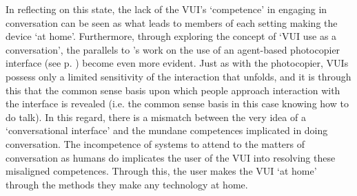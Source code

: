 \begin{corrections}
In reflecting on this state, the lack of the \ac{VUI}'s `competence' in engaging in conversation can be seen as what leads to members of each setting making the device `at home'.
Furthermore, through exploring the concept of `\ac{VUI} use as a conversation', the parallels to \citet{Suchman1985}'s work on the use of an agent-based photocopier interface (see p. \pageref{line:suchman}) become even more evident.
Just as with the photocopier, \acp{VUI} possess only a limited sensitivity of the interaction that unfolds, and it is through this that the common sense basis upon which people approach interaction with the interface is revealed (i.e. the common sense basis in this case knowing how to do talk).
In this regard, there is a mismatch between the very idea of a `conversational interface' and the mundane competences implicated in doing conversation.
The incompetence of systems to attend to the matters of conversation as humans do implicates the user of the \ac{VUI} into resolving these misaligned competences.
Through this, the user makes the \ac{VUI} `at home' through the methods they make any technology at home.
\end{corrections}









